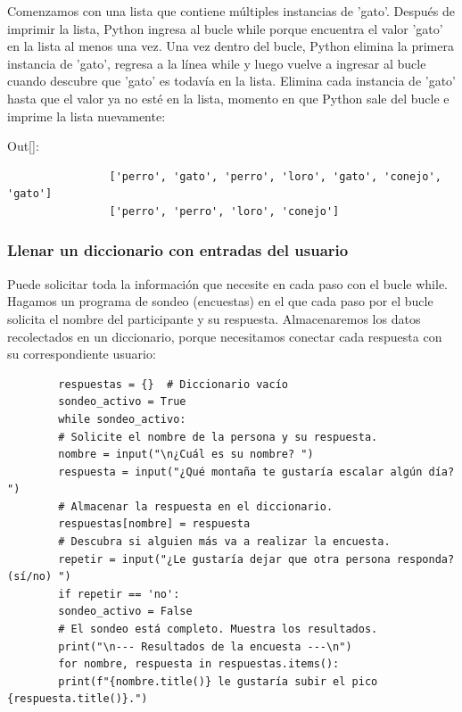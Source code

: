 	Comenzamos con una lista que contiene múltiples instancias de 'gato'. Después de imprimir
	la lista, Python ingresa al bucle {\ttfamily while} porque encuentra el valor 'gato' en la lista
	al menos una vez. Una vez dentro del bucle, Python elimina la primera instancia de 'gato',
	regresa a la línea {\ttfamily while} y luego vuelve a ingresar al bucle cuando descubre que 'gato' es
	todavía en la lista. Elimina cada instancia de 'gato' hasta que el valor ya no esté en
	la lista, momento en que Python sale del bucle e imprime la lista nuevamente: \vspace{0.08cm}
	
	{\ttfamily\scriptsize\scriptsize \noindent Out[]: \vspace{-0.3cm}	
		{\color{blue} 		
			\begin{verbatim}
				['perro', 'gato', 'perro', 'loro', 'gato', 'conejo', 'gato']
				['perro', 'perro', 'loro', 'conejo'] 			
			\end{verbatim}
	}}
	
	
	\subsubsection{Llenar un diccionario con entradas del usuario}
	
	Puede solicitar toda la información que necesite en cada paso con el bucle 
	{\ttfamily while}. Hagamos un programa de sondeo (encuestas) en el que cada  paso por el bucle
	solicita el nombre del participante y su respuesta. Almacenaremos los datos recolectados en un diccionario, porque necesitamos  conectar cada respuesta con su correspondiente usuario:
	
	
	\hspace{-2.3cm}{\ttfamily \scriptsize sondeo.py}  \vspace{-0.5cm}
	\begin{lstlisting}		
		respuestas = {}  # Diccionario vacío
		sondeo_activo = True	
		while sondeo_activo:
		# Solicite el nombre de la persona y su respuesta.
		nombre = input("\n¿Cuál es su nombre? ")
		respuesta = input("¿Qué montaña te gustaría escalar algún día? ")
		# Almacenar la respuesta en el diccionario.
		respuestas[nombre] = respuesta
		# Descubra si alguien más va a realizar la encuesta.
		repetir = input("¿Le gustaría dejar que otra persona responda? (sí/no) ")
		if repetir == 'no':
		sondeo_activo = False
		# El sondeo está completo. Muestra los resultados.
		print("\n--- Resultados de la encuesta ---\n")
		for nombre, respuesta in respuestas.items():
		print(f"{nombre.title()} le gustaría subir el pico {respuesta.title()}.")
	\end{lstlisting}	
	
